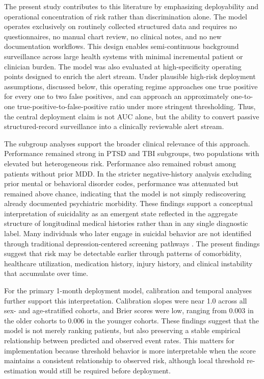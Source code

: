 \documentclass[onecolumn, compsoc,11pt]{IEEEtran}
\begin{document}
The present study contributes to this literature by emphasizing deployability and operational concentration of risk rather than discrimination alone. The model operates exclusively on routinely collected structured data and requires no questionnaires, no manual chart review, no clinical notes, and no new documentation workflows. This design enables semi-continuous background surveillance across large health systems with minimal incremental patient or clinician burden. The model was also evaluated at high-specificity operating points designed to enrich the alert stream. Under plausible high-risk deployment assumptions, discussed below, this operating regime approaches one true positive for every one to two false positives, and can approach an approximately one-to-one true-positive-to-false-positive ratio under more stringent thresholding. Thus, the central deployment claim is not AUC alone, but the ability to convert passive structured-record surveillance into a clinically reviewable alert stream.

The subgroup analyses support the broader clinical relevance of this approach. Performance remained strong in PTSD and TBI subgroups, two populations with elevated but heterogeneous risk. Performance also remained robust among patients without prior MDD. In the stricter negative-history analysis excluding prior mental or behavioral disorder codes, performance was attenuated but remained above chance, indicating that the model is not simply rediscovering already documented psychiatric morbidity. These findings support a conceptual interpretation of suicidality as an emergent state reflected in the aggregate structure of longitudinal medical histories rather than in any single diagnostic label. Many individuals who later engage in suicidal behavior are not identified through traditional depression-centered screening pathways \cite{tang2022people,fowler2022suicide}. The present findings suggest that risk may be detectable earlier through patterns of comorbidity, healthcare utilization, medication history, injury history, and clinical instability that accumulate over time.

For the primary 1-month deployment model, calibration and temporal analyses further support this interpretation. Calibration slopes were near 1.0 across all sex- and age-stratified cohorts, and Brier scores were low, ranging from 0.003 in the older cohorts to 0.006 in the younger cohorts. These findings suggest that the model is not merely ranking patients, but also preserving a stable empirical relationship between predicted and observed event rates. This matters for implementation because threshold behavior is more interpretable when the score maintains a consistent relationship to observed risk, although local threshold re-estimation would still be required before deployment.
\end{document}
